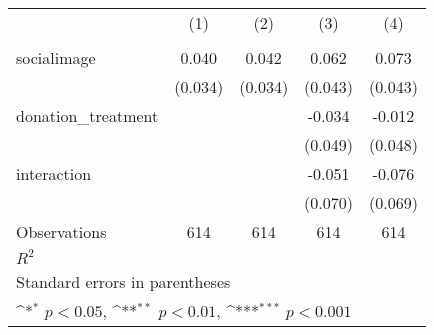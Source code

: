 {
\def\sym#1{\ifmmode^{#1}\else\(^{#1}\)\fi}
\begin{tabular}{l*{4}{c}}
\hline\hline
            &\multicolumn{1}{c}{(1)}&\multicolumn{1}{c}{(2)}&\multicolumn{1}{c}{(3)}&\multicolumn{1}{c}{(4)}\\
            &\multicolumn{1}{c}{} &\multicolumn{1}{c}{} &\multicolumn{1}{c}{} &\multicolumn{1}{c}{} \\
\hline
socialimage &       0.040         &       0.042         &       0.062         &       0.073         \\
            &     (0.034)         &     (0.034)         &     (0.043)         &     (0.043)         \\
[1em]
donation\_treatment&                     &                     &      -0.034         &      -0.012         \\
            &                     &                     &     (0.049)         &     (0.048)         \\
[1em]
interaction &                     &                     &      -0.051         &      -0.076         \\
            &                     &                     &     (0.070)         &     (0.069)         \\
\hline
Observations&         614         &         614         &         614         &         614         \\
\(R^{2}\)   &                     &                     &                     &                     \\
\hline\hline
\multicolumn{5}{l}{\footnotesize Standard errors in parentheses}\\
\multicolumn{5}{l}{\footnotesize \sym{*} \(p<0.05\), \sym{**} \(p<0.01\), \sym{***} \(p<0.001\)}\\
\end{tabular}
}
